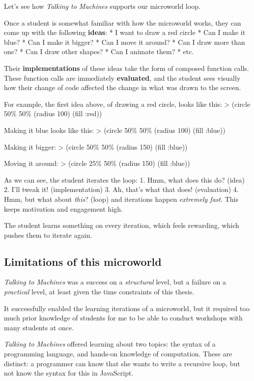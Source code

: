 Let's see how \emph{Talking to Machines} supports our microworld loop.

Once a student is somewhat familiar with how the microworld works, they
can come up with the following \textbf{ideas}: * I want to draw a red
circle * Can I make it blue? * Can I make it bigger? * Can I move it
around? * Can I draw more than one? * Can I draw other shapes? * Can I
animate them? * etc.

Their \textbf{implementations} of these ideas take the form of composed
function calls. These function calls are immediately \textbf{evaluated},
and the student sees visually how their change of code affected the
change in what was drawn to the screen.

For example, the first idea above, of drawing a red circle, looks like
this: \textgreater{} (circle 50\% 50\% (radius 100) (fill :red))

Making it blue looks like this: \textgreater{} (circle 50\% 50\% (radius
100) (fill :blue))

Making it bigger: \textgreater{} (circle 50\% 50\% (radius 150) (fill
:blue))

Moving it around: \textgreater{} (circle 25\% 50\% (radius 150) (fill
:blue))

As we can see, the student iterates the loop: 1. Hmm, what does this do?
(idea) 2. I'll tweak it! (implementation) 3. Ah, that's what that does!
(evaluation) 4. Hmm, but what about \emph{this}? (loop) and iterations
happen \emph{extremely fast}. This keeps motivation and engagement high.

The student learns something on every iteration, which feels rewarding,
which pushes them to iterate again.

\subsection{Limitations of this microworld}

\emph{Talking to Machines} was a success on a \emph{structural} level,
but a failure on a \emph{practical} level, at least given the time
constraints of this thesis.

It successfully enabled the learning iterations of a microworld, but it
required too much prior knowledge of students for me to be able to
conduct workshops with many students at once.

\emph{Talking to Machines} offered learning about two topics: the syntax
of a programming language, and hands-on knowledge of computation. These
are distinct: a programmer can know that she wants to write a recursive
loop, but not know the syntax for this in JavaScript.

